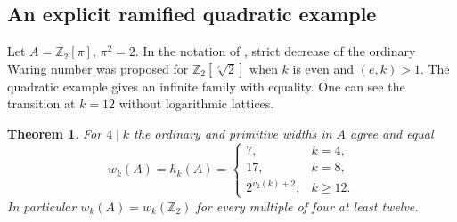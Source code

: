 \documentclass[11pt,letterpaper]{article}
\newtheorem{theorem}{Theorem}[section]
\theoremstyle{definition}
\numberwithin{equation}{section}
\begin{document}
\subsection{An explicit ramified quadratic example}
\label{sec:sqrt-two-local}
Let $A=\mathbb Z_2[\pi]$, $\pi^2=2$. In the notation of
\cite[Conjecture~3.3, preprint v5]{AnthonyRam}, strict decrease
of the ordinary Waring number was proposed for $\mathbb Z_2[\sqrt[e]2]$
when $k$ is even and $(e,k)>1$. The quadratic example gives an
infinite family with equality. One can see the transition at
$k=12$ without logarithmic lattices.
\begin{theorem}\label{thm:sqrt-two-exact}
For $4\mid k$ the ordinary and primitive widths in $A$ agree and equal
\[
 w_k(A)=h_k(A)=
 \begin{cases}
       7,&k=4,\\
       17,&k=8,\\
       2^{v_2(k)+2},&k\ge12.
 \end{cases}
\]
In particular $w_k(A)=w_k(\mathbb Z_2)$ for every multiple of four
at least twelve.
\end{theorem}
\end{document}
